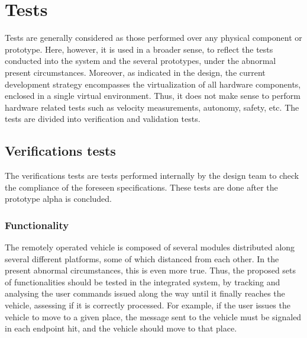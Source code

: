 \section{Tests}%
\label{sec:org3e2776f}
Tests are generally considered as those performed over any physical
component or prototype. Here, however, it is used in a broader sense, to reflect the tests
conducted into the system and the several prototypes, under the abnormal present
circumstances. Moreover, as indicated in the design, the current development
strategy encompasses the virtualization of all hardware components, enclosed
in a single virtual environment. Thus, it does not make sense to perform
hardware related tests such as velocity measurements, autonomy, safety, etc.
The tests are divided into verification and validation tests.
\subsection{Verifications tests}%
\label{sec:orge9c79e2}
The verifications tests are tests performed internally by the design team to
check the compliance of the foreseen specifications. These tests are done after
the prototype alpha is concluded.

\subsubsection{Functionality}%
\label{sec:functionality}
The remotely operated vehicle is composed of several modules distributed along
several different platforms, some of which distanced from each other. In the
present abnormal circumstances, this is even more true. Thus, the proposed sets
of functionalities should be tested in the integrated system, by tracking and
analysing the user commands issued along the way until it finally reaches the
vehicle, assessing if it is correctly processed. For example, if the user issues
the vehicle to move to a given place, the message sent to the vehicle must be
signaled in each endpoint hit, and the vehicle should move to that place.

